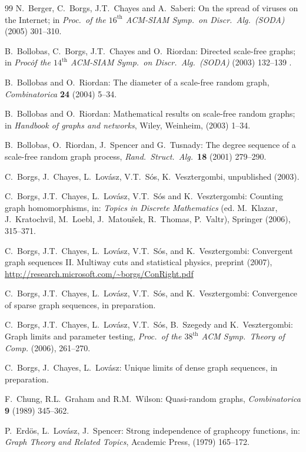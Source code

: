 \documentclass[12pt]{article}
\numberwithin{equation}{section}
\begin{document}
\begin{thebibliography}{99}
 N.~Berger, C.~Borgs, J.T.~Chayes and A.~Saberi:
On the spread of viruses on the Internet; in {\it  Proc.\ of the
$\text{16}^\text{th}$ ACM-SIAM Symp.\ on Discr.\ Alg.\ (SODA)} (2005)
301--310.

 B.~Bollobas, C.~Borgs, J.T.~Chayes and O.~Riordan:
Directed scale-free graphs; in {\it  Proc\. of the
$\text{14}^\text{th}$ ACM-SIAM Symp.\ on Discr.\ Alg.\ (SODA)} (2003)
132--139 .

 B.~Bollobas and O.~Riordan:
The diameter of a scale-free random graph, {\it Combinatorica} {\bf
24} (2004) 5--34.

 B.~Bollobas and O.~Riordan:
Mathematical results on scale-free random graphs;
in {\it Handbook of graphs and networks}, Wiley, Weinheim, (2003)
1--34.

 B.~Bollobas, O.~Riordan, J.~Spencer and G.~Tusnady:
The degree sequence of a scale-free random graph process,
{\it Rand.\ Struct.\ Alg.\ }{\bf 18} (2001) 279--290.

 C.~Borgs, J.~Chayes, L.~Lov\'asz,
V.T.~S\'os, K.~Vesztergombi, unpublished (2003).

C.~Borgs, J.T.~Chayes, L.~Lov\'asz, V.T.~S\'os and K.~Vesztergombi:
Counting graph homomorphisms, in: {\it Topics in Discrete
Mathematics} (ed. M.~Klazar, J.~Kratochvil, M.~Loebl,
J.~Matou\v{s}ek, R.~Thomas, P.~Valtr), Springer (2006), 315--371.

C.~Borgs, J.T.~Chayes, L.~Lov\'asz, V.T.~S\'os, and K.~Vesztergombi:
Convergent graph sequences II.
Multiway cuts and statistical physics, preprint (2007),
\\ \url{
http://research.microsoft.com/~borgs/ConRight.pdf}


C.~Borgs, J.T.~Chayes, L.~Lov\'asz, V.T.~S\'os, and K.~Vesztergombi:
Convergence of sparse graph sequences, in preparation.

C.~Borgs, J.T.~Chayes, L.~Lov\'asz, V.T.~S\'os, B.~Szegedy and
K.~Vesztergombi: Graph limits and parameter testing, {\it Proc.\ of
the $\text{38}^\text{th}$ ACM Symp.\ Theory of Comp.} (2006),
261--270.

C.~Borgs, J.~Chayes, L.~Lov\'asz: Unique limits of dense graph
sequences, in preparation.

F.~Chung, R.L.~Graham and R.M.~Wilson: Quasi-random graphs, {\it
Combinatorica} {\bf 9} (1989) 345--362.

P.~Erd\"os, L.~Lov\'asz, J.~Spencer: Strong independence of graphcopy
functions, in: {\it Graph Theory and Related Topics}, Academic Press,
(1979) 165--172.


\end{thebibliography}
\end{document}
